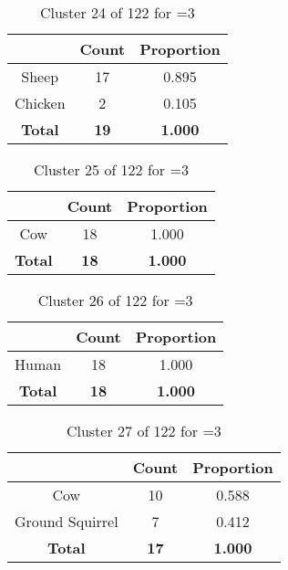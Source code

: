 \begin{table}[ht!]
\centering
\begin{tabular}{|c|c|c|}
\hline
\bf \Spec{} &\bf Count &\bf Proportion\\ \hline \hline
Sheep & 17 & 0.895\\ \hline
Chicken & 2 & 0.105\\ \hline
\hline
\bf Total & \bf 19 & \bf 1.000\\ \hline
\end{tabular}
\label{tab:cluster:24:3}
\caption{Cluster 24 of 122 for \minneigh{}=3}
\end{table}

\begin{table}[ht!]
\centering
\begin{tabular}{|c|c|c|}
\hline
\bf \Spec{} &\bf Count &\bf Proportion\\ \hline \hline
Cow & 18 & 1.000\\ \hline
\hline
\bf Total & \bf 18 & \bf 1.000\\ \hline
\end{tabular}
\label{tab:cluster:25:3}
\caption{Cluster 25 of 122 for \minneigh{}=3}
\end{table}

\begin{table}[ht!]
\centering
\begin{tabular}{|c|c|c|}
\hline
\bf \Spec{} &\bf Count &\bf Proportion\\ \hline \hline
Human & 18 & 1.000\\ \hline
\hline
\bf Total & \bf 18 & \bf 1.000\\ \hline
\end{tabular}
\label{tab:cluster:26:3}
\caption{Cluster 26 of 122 for \minneigh{}=3}
\end{table}

\begin{table}[ht!]
\centering
\begin{tabular}{|c|c|c|}
\hline
\bf \Spec{} &\bf Count &\bf Proportion\\ \hline \hline
Cow & 10 & 0.588\\ \hline
Ground Squirrel & 7 & 0.412\\ \hline
\hline
\bf Total & \bf 17 & \bf 1.000\\ \hline
\end{tabular}
\label{tab:cluster:27:3}
\caption{Cluster 27 of 122 for \minneigh{}=3}
\end{table}


